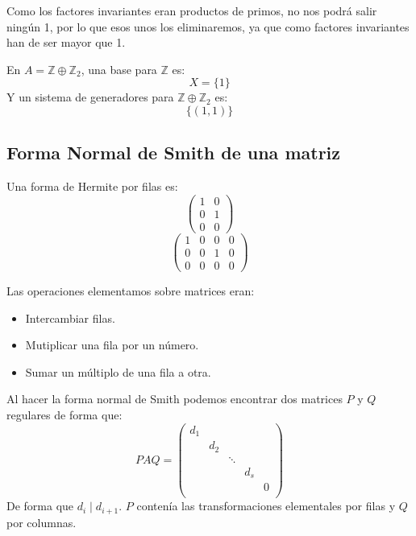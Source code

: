 \noindent
Como los factores invariantes eran productos de primos, no nos podrá salir ningún 1, por lo que esos unos los eliminaremos, ya que como factores invariantes han de ser mayor que 1.

\begin{ejemplo}
    En $A = \mathbb{Z} \oplus \mathbb{Z}_2$, una base para $\mathbb{Z}$ es:
    \begin{equation*}
        X = \{1\}
    \end{equation*}
    Y un sistema de generadores para $\mathbb{Z}\oplus\mathbb{Z}_2$ es:
    \begin{equation*}
        \{(1,1)\}
    \end{equation*}
\end{ejemplo}

\subsection{Forma Normal de Smith de una matriz}
\begin{ejemplo}
    Una forma de Hermite por filas es:
    \begin{equation*}
        \left(\begin{array}{ccc}
            1 & 0 \\
            0 & 1 \\
            0 & 0  
        \end{array}\right)
    \end{equation*}
    \begin{equation*}
        \left(\begin{array}{cccc}
            1 & 0 & 0 & 0 \\
            0 & 0 & 1 & 0 \\
            0 & 0 & 0 & 0
        \end{array}\right)
    \end{equation*}
\end{ejemplo}

Las operaciones elementamos sobre matrices eran:
\begin{itemize}
    \item Intercambiar filas.
    \item Mutiplicar una fila por un número.
    \item Sumar un múltiplo de una fila a otra.
\end{itemize}
Al hacer la forma normal de Smith podemos encontrar dos matrices $P$ y $Q$ regulares de forma que:
\begin{equation*}
    PAQ = \left(\begin{array}{ccccc}
            d_1 &  &  & & \\
                & d_2 &  & & \\
                &  & \ddots & & \\
                &  &  &  d_s & \\
                &  &  &   &  0\\
    \end{array}\right)
\end{equation*}
De forma que $d_i \mid d_{i+1}$. $P$ contenía las transformaciones elementales por filas y $Q$ por columnas.

